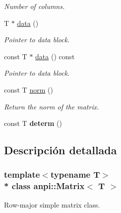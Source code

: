 \begin{DoxyCompactItemize}
\begin{DoxyCompactList}\small\item\em Number of columns. \end{DoxyCompactList}\item 
T $\ast$ \hyperlink{classanpi_1_1Matrix_ad620d822fefc019cef07f4c1fb1c7052}{data} ()\hypertarget{classanpi_1_1Matrix_ad620d822fefc019cef07f4c1fb1c7052}{}\label{classanpi_1_1Matrix_ad620d822fefc019cef07f4c1fb1c7052}

\begin{DoxyCompactList}\small\item\em Pointer to data block. \end{DoxyCompactList}\item 
const T $\ast$ \hyperlink{classanpi_1_1Matrix_a1f1196beed4607edc1509ede6ef26217}{data} () const \hypertarget{classanpi_1_1Matrix_a1f1196beed4607edc1509ede6ef26217}{}\label{classanpi_1_1Matrix_a1f1196beed4607edc1509ede6ef26217}

\begin{DoxyCompactList}\small\item\em Pointer to data block. \end{DoxyCompactList}\item 
const T \hyperlink{classanpi_1_1Matrix_a404201aad5948d0ccae15b65a4e2d5ad}{norm} ()\hypertarget{classanpi_1_1Matrix_a404201aad5948d0ccae15b65a4e2d5ad}{}\label{classanpi_1_1Matrix_a404201aad5948d0ccae15b65a4e2d5ad}

\begin{DoxyCompactList}\small\item\em Return the norm of the matrix. \end{DoxyCompactList}\item 
const T {\bfseries determ} ()\hypertarget{classanpi_1_1Matrix_afaf714fe0f8a2330ce080dff8a0819af}{}\label{classanpi_1_1Matrix_afaf714fe0f8a2330ce080dff8a0819af}

\end{DoxyCompactItemize}


\subsection{Descripción detallada}
\subsubsection*{template$<$typename T$>$\\*
class anpi\+::\+Matrix$<$ T $>$}

Row-\/major simple matrix class. 

